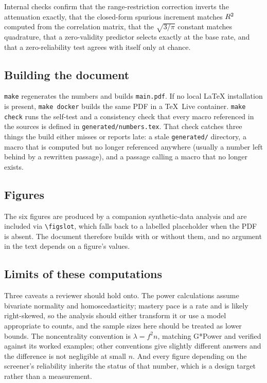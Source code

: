 Internal checks confirm that the range-restriction correction inverts the
attenuation exactly, that the closed-form spurious increment matches $R^{2}$
computed from the correlation matrix, that the $\sqrt{3/\pi}$ constant matches
quadrature, that a zero-validity predictor selects exactly at the base rate, and
that a zero-reliability test agrees with itself only at chance.

\subsection{Building the document}

\texttt{make} regenerates the numbers and builds \texttt{main.pdf}. If no local
\LaTeX{} installation is present, \texttt{make docker} builds the same PDF in a
TeX~Live container. \texttt{make check} runs the self-test and a consistency
check that every macro referenced in the sources is defined in
\texttt{generated/numbers.tex}. That check catches three things the build
either misses or reports late: a stale \texttt{generated/} directory, a macro
that is computed but no longer referenced anywhere (usually a number left behind
by a rewritten passage), and a passage calling a macro that no longer exists.

\subsection{Figures}

The six figures are produced by a companion synthetic-data analysis and are
included via \texttt{\textbackslash figslot}, which falls back to a labelled
placeholder when the PDF is absent. The document therefore builds with or
without them, and no argument in the text depends on a figure's values.

\subsection{Limits of these computations}

Three caveats a reviewer should hold onto. The power calculations assume
bivariate normality and homoscedasticity; mastery pace is a rate and is likely
right-skewed, so the analysis should either transform it or use a model
appropriate to counts, and the sample sizes here should be treated as lower
bounds. The noncentrality convention is $\lambda=f^{2}n$, matching G*Power and
verified against its worked examples; other conventions give slightly different
answers and the difference is not negligible at small $n$. And every figure
depending on the screener's reliability inherits the status of that number,
which is a design target rather than a measurement.


